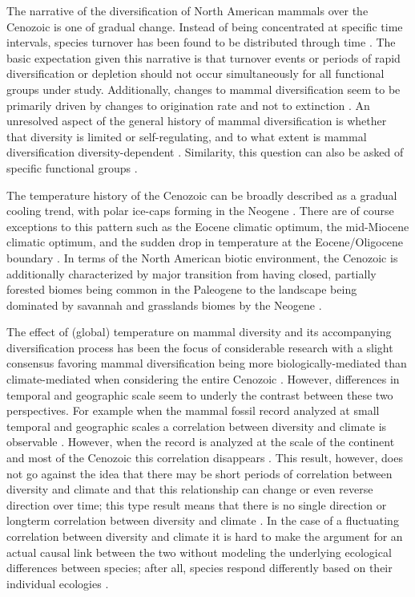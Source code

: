 \documentclass[12pt,letterpaper]{article}
\begin{document}
The narrative of the diversification of North American mammals over the Cenozoic is one of gradual change. Instead of being concentrated at specific time intervals, species turnover has been found to be distributed through time \citep{Alroy2009,Alroy1996a,Eronen2015,Janis1993b,Alroy2000g}. The basic expectation given this narrative is that turnover events or periods of rapid diversification or depletion should not occur simultaneously for all functional groups under study. Additionally, changes to mammal diversification seem to be primarily driven by changes to origination rate and not to extinction \citep{Alroy1996a,Alroy2000g,Alroy2009}. An unresolved aspect of the general history of mammal diversification is whether that diversity is limited or self-regulating, and to what extent is mammal diversification diversity-dependent \citep{Alroy2009,Rabosky2015b,Harmon2015a,Rabosky2013a}. Similarity, this question can also be asked of specific functional groups \citep{Jernvall2004,Valkenburgh1999,Silvestro2015b,Quental2013}.

The temperature history of the Cenozoic can be broadly described as a gradual cooling trend, with polar ice-caps forming in the Neogene \citep{Zachos2001,Zachos2008,Cramer2011}. There are of course exceptions to this pattern such as the Eocene climatic optimum, the mid-Miocene climatic optimum, and the sudden drop in temperature at the Eocene/Oligocene boundary \citep{Zachos2001,Zachos2008}. In terms of the North American biotic environment, the Cenozoic is additionally characterized by major transition from having closed, partially forested biomes being common in the Paleogene to the landscape being dominated by savannah and grasslands biomes by the Neogene \citep{Blois2009,Janis1993b,Janis2000,Stromberg2005}. 

The effect of (global) temperature on mammal diversity and its accompanying diversification process has been the focus of considerable research with a slight consensus favoring mammal diversification being more biologically-mediated than climate-mediated when considering the entire Cenozoic \citep{Alroy2000g,Figueirido2012,Clyde1998a}. However, differences in temporal and geographic scale seem to underly the contrast between these two perspectives. For example when the mammal fossil record analyzed at small temporal and geographic scales a correlation between diversity and climate is observable \citep{Clyde1998a,Woodburne2009}. However, when the record is analyzed at the scale of the continent and most of the Cenozoic this correlation disappears \citep{Alroy2000g}. This result, however, does not go against the idea that there may be short periods of correlation between diversity and climate and that this relationship can change or even reverse direction over time; this type result means that there is no single direction or longterm correlation between diversity and climate \citep{Figueirido2012}. In the case of a fluctuating correlation between diversity and climate it is hard to make the argument for an actual causal link between the two without modeling the underlying ecological differences between species; after all, species respond differently based on their individual ecologies \citep{Blois2009}. 
\end{document}
